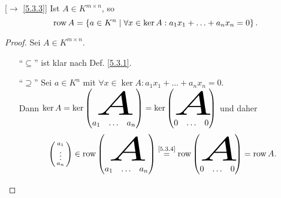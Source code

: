 \documentclass[../../main.tex]{subfiles}
\begin{document}
\begin{kor}\mbox{}\label{5.3.5}
{\rm[$\to$ \ref{5.3.3}]} Ist $A\in K^{m\times n}$, so
$$\operatorname{row} A = \left\{a\in K^n \mid\forall x\in \ker A: a_1x_1+\ldots+a_nx_n = 0\right\}.$$
\end{kor}
\begin{proof}
Sei $A\in K^{m\times n}$.
\begin{itemize}
\item["`$\subseteq$"'] ist klar nach Def. \ref{5.3.1}.
\item["`$\supseteq$"'] Sei $a\in K^n$ mit $\forall x\in \ker A:a_1x_1+\ldots+a_nx_n = 0$.\\
Dann $\ker A=\ker\begin{pmatrix}&&\\
&\begin{tikzpicture}[overlay]\node[xshift=0.2em,yshift=0.25em,xscale=6,yscale=4]{$A$};\end{tikzpicture}&\\
&&\\
a_1&\ldots&a_n\end{pmatrix}
= \ker\begin{pmatrix}&&\\
&\begin{tikzpicture}[overlay]\node[xshift=0.2em,yshift=0.25em,xscale=6,yscale=4]{$A$};\end{tikzpicture}&\\
&&\\
0&\ldots&0\end{pmatrix}$ und daher 
$$\cvec{a_1\\\vdots\\a_n}\in\row
\begin{pmatrix}&&\\
&\begin{tikzpicture}[overlay]\node[xshift=0.2em,yshift=0.25em,xscale=6,yscale=4]{$A$};\end{tikzpicture}&\\
&&\\
a_1&\ldots&a_n\end{pmatrix}
\overset{\text{\ref{5.3.4}}}{=}\row
\begin{pmatrix}&&\\
&\begin{tikzpicture}[overlay]\node[xshift=0.2em,yshift=0.25em,xscale=6,yscale=4]{$A$};\end{tikzpicture}&\\
&&\\
0&\ldots&0\end{pmatrix}=\row A.$$
\end{itemize}
\end{proof}
\end{document}
